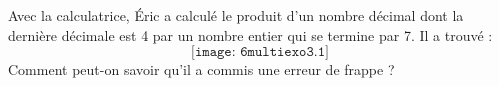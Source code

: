 Avec la calculatrice, \'Eric a calculé le produit d'un nombre décimal dont la dernière décimale est 4 par un nombre entier qui se termine par 7. Il a trouvé :
\[\texttt{[image: 6multiexo3.1]}\]
Comment peut-on savoir qu'il a commis une erreur de frappe ?